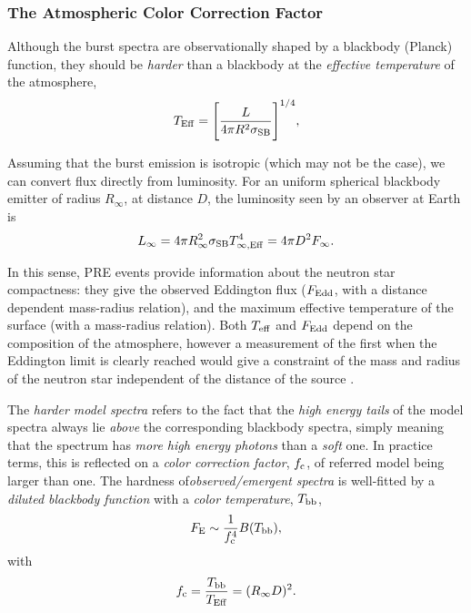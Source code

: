 {\subsubsection*{The Atmospheric Color Correction  Factor} 


Although the burst spectra are observationally shaped by a blackbody (Planck) function, they should be {\it harder} than a blackbody at the {\it effective temperature} of the atmosphere,
\begin{equation}
T_{\rm Eff} = \Bigg[\frac{L}{4\pi R^2 \sigma_{\rm SB}} \Bigg]^{1/4},
\label{teff}
\end{equation}

\quad


Assuming  that the burst emission is isotropic (which may not be the case), we can  convert  flux directly from luminosity.  For an  uniform spherical blackbody emitter of radius $R_{\infty}$, at distance $D$, the luminosity seen by an observer at Earth is
\begin{equation*}
L_{\infty} = 4\pi R_{\infty}^2   \sigma_{\rm SB} T_{\infty, \rm Eff}^4 = 4\pi D^2 F_{\infty}.
\end{equation*}

\quad



 In this sense, PRE events provide information about the neutron star compactness: they give the observed Eddington flux ($F_{\rm Edd}$, with a distance dependent mass-radius relation),  and the maximum effective temperature of the surface (with a mass-radius relation). Both $T_{\rm eff}$ and $F_{\rm Edd}$  depend on the composition of the atmosphere, however a measurement of the first when the Eddington limit is clearly reached would give a constraint of the mass and radius of the neutron star independent of the distance of the source  \cite{BI00} \cite{SPW10}.

\quad

The {\it harder model spectra}  refers to the fact that the {\it high energy tails} of the model spectra always lie {\it above} the corresponding blackbody spectra, simply meaning that the spectrum has  {\it more high energy photons} than a {\it soft} one.  In practice terms, this is reflected on a {\it color correction factor}, $f_{\rm c}$, of referred model being larger than one.  The hardness of{\it observed/emergent spectra} is well-fitted by a {\it diluted blackbody function} with a {\it color temperature}, $T_{\rm bb}$,
\begin{equation}
 F_{\rm E} \sim \frac{1}{f_{\rm c}^4} B(T_{\rm bb}),
 \label{dilbb}
\end{equation}
with
\begin{equation*}
 f_{\rm c} =\frac{T_{\rm bb}}{T_{\rm Eff}} = (R_{\infty}{D})^2.
 \label{fc}
\end{equation*}


}

